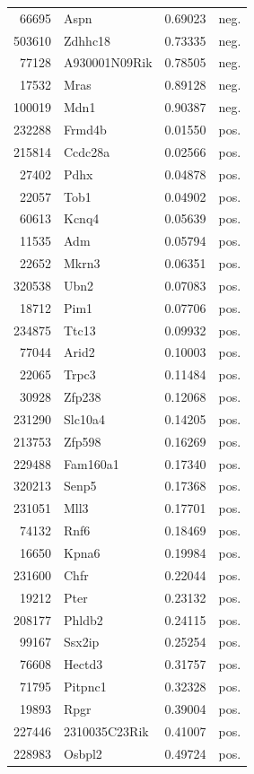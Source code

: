 \documentclass{article}
\begin{document}
\begin{Schunk}
\begin{longtable}{rlrl}
  66695 & Aspn & 0.69023 & neg. \\ 
  503610 & Zdhhc18 & 0.73335 & neg. \\ 
  77128 & A930001N09Rik & 0.78505 & neg. \\ 
  17532 & Mras & 0.89128 & neg. \\ 
  100019 & Mdn1 & 0.90387 & neg. \\ 
  232288 & Frmd4b & 0.01550 & pos. \\ 
  215814 & Ccdc28a & 0.02566 & pos. \\ 
  27402 & Pdhx & 0.04878 & pos. \\ 
  22057 & Tob1 & 0.04902 & pos. \\ 
  60613 & Kcnq4 & 0.05639 & pos. \\ 
  11535 & Adm & 0.05794 & pos. \\ 
  22652 & Mkrn3 & 0.06351 & pos. \\ 
  320538 & Ubn2 & 0.07083 & pos. \\ 
  18712 & Pim1 & 0.07706 & pos. \\ 
  234875 & Ttc13 & 0.09932 & pos. \\ 
  77044 & Arid2 & 0.10003 & pos. \\ 
  22065 & Trpc3 & 0.11484 & pos. \\ 
  30928 & Zfp238 & 0.12068 & pos. \\ 
  231290 & Slc10a4 & 0.14205 & pos. \\ 
  213753 & Zfp598 & 0.16269 & pos. \\ 
  229488 & Fam160a1 & 0.17340 & pos. \\ 
  320213 & Senp5 & 0.17368 & pos. \\ 
  231051 & Mll3 & 0.17701 & pos. \\ 
  74132 & Rnf6 & 0.18469 & pos. \\ 
  16650 & Kpna6 & 0.19984 & pos. \\ 
  231600 & Chfr & 0.22044 & pos. \\ 
  19212 & Pter & 0.23132 & pos. \\ 
  208177 & Phldb2 & 0.24115 & pos. \\ 
  99167 & Ssx2ip & 0.25254 & pos. \\ 
  76608 & Hectd3 & 0.31757 & pos. \\ 
  71795 & Pitpnc1 & 0.32328 & pos. \\ 
  19893 & Rpgr & 0.39004 & pos. \\ 
  227446 & 2310035C23Rik & 0.41007 & pos. \\ 
  228983 & Osbpl2 & 0.49724 & pos. \\ 

\end{longtable}
\end{Schunk}
\end{document}

